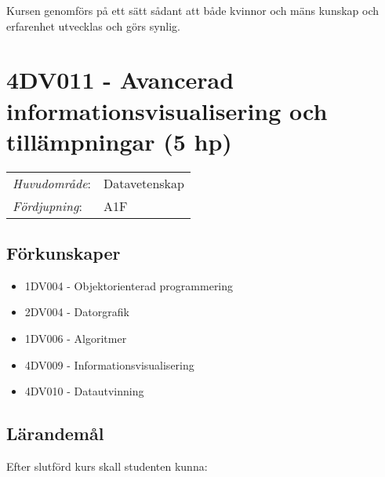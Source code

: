 Kursen genomförs på ett sätt sådant att både kvinnor och mäns kunskap och erfarenhet utvecklas och görs synlig.
\pagebreak
\section*{4DV011 - Avancerad informationsvisualisering och tillämpningar (5 hp)}

\begin{tabular}{ll}\emph{Huvudområde}: & Datavetenskap\tabularnewline\emph{Fördjupning}: & A1F\tabularnewline\end{tabular}

\subsection*{Förkunskaper}

\begin{itemize}
\tightlist
\item
  1DV004 - Objektorienterad programmering
\item
  2DV004 - Datorgrafik
\item
  1DV006 - Algoritmer
\item
  4DV009 - Informationsvisualisering
\item
  4DV010 - Datautvinning
\end{itemize}

\subsection*{Lärandemål}

Efter slutförd kurs skall studenten kunna:

